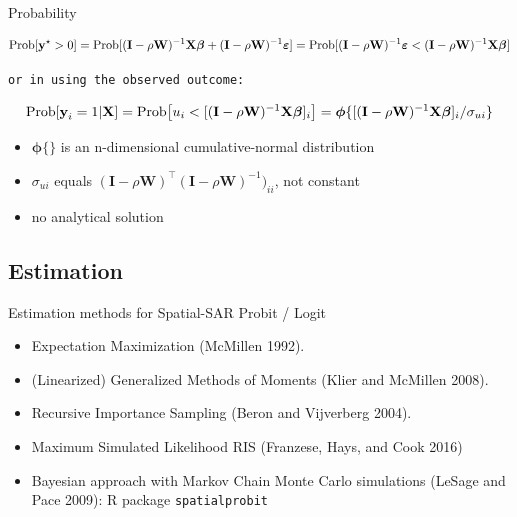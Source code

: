 \documentclass[
  letterpaper,
]{scrbook}
\begin{document}
Probability

\[
        \mathrm{Prob}[{\boldsymbol{\mathbf{y}}^\star}>0]  = 
        \mathrm{Prob}[(\boldsymbol{\mathbf{I}} - \rho{\boldsymbol{\mathbf{W}}})^{-1}{\boldsymbol{\mathbf{X}}}{\boldsymbol{\mathbf{\beta}}} + 
        (\boldsymbol{\mathbf{I}} - \rho{\boldsymbol{\mathbf{W}}})^{-1}{\boldsymbol{\mathbf{\varepsilon}}}] \\
          =  \mathrm{Prob}[(\boldsymbol{\mathbf{I}} - \rho{\boldsymbol{\mathbf{W}}})^{-1}{\boldsymbol{\mathbf{\varepsilon}}} <
         (\boldsymbol{\mathbf{I}} - \rho{\boldsymbol{\mathbf{W}}})^{-1}{\boldsymbol{\mathbf{X}}}{\boldsymbol{\mathbf{\beta}}}] \nonumber
\]

\begin{verbatim}
or in using the observed outcome:
\end{verbatim}

\[
        \mathrm{Prob}[\boldsymbol{\mathbf{y}}_i=1 | \boldsymbol{\mathbf{X}}]  = 
        \mathrm{Prob}\big[u_i <
         [(\boldsymbol{\mathbf{I}} - \rho{\boldsymbol{\mathbf{W}}})^{-1}{\boldsymbol{\mathbf{X}}}{\boldsymbol{\mathbf{\beta}}}]_i\big] \\
          = \boldsymbol{\mathbf{\phi}}\{[(\boldsymbol{\mathbf{I}} - \rho{\boldsymbol{\mathbf{W}}})^{-1}{\boldsymbol{\mathbf{X}}}{\boldsymbol{\mathbf{\beta}}}]_i 
         / \sigma_{ui}\} 
\]

\begin{itemize}
\item
  \(\boldsymbol{\mathbf{\phi}}\{\}\) is an n-dimensional
  cumulative-normal distribution
\item
  \(\sigma_{ui}\) equals
  \((\boldsymbol{\mathbf{I}} - \rho{\boldsymbol{\mathbf{W}}})^\intercal (\boldsymbol{\mathbf{I}} - \rho{\boldsymbol{\mathbf{W}}})^{-1})_{ii}\),
  not constant
\item
  no analytical solution
\end{itemize}

\hypertarget{estimation}{%
\subsection{Estimation}\label{estimation}}

Estimation methods for Spatial-SAR Probit / Logit

\begin{itemize}
\item
  Expectation Maximization (McMillen 1992).
\item
  (Linearized) Generalized Methods of Moments (Klier and McMillen 2008).
\item
  Recursive Importance Sampling (Beron and Vijverberg 2004).
\item
  Maximum Simulated Likelihood RIS (Franzese, Hays, and Cook 2016)
\item
  Bayesian approach with Markov Chain Monte Carlo simulations (LeSage
  and Pace 2009): R package \texttt{spatialprobit}
\end{itemize}
\end{document}

